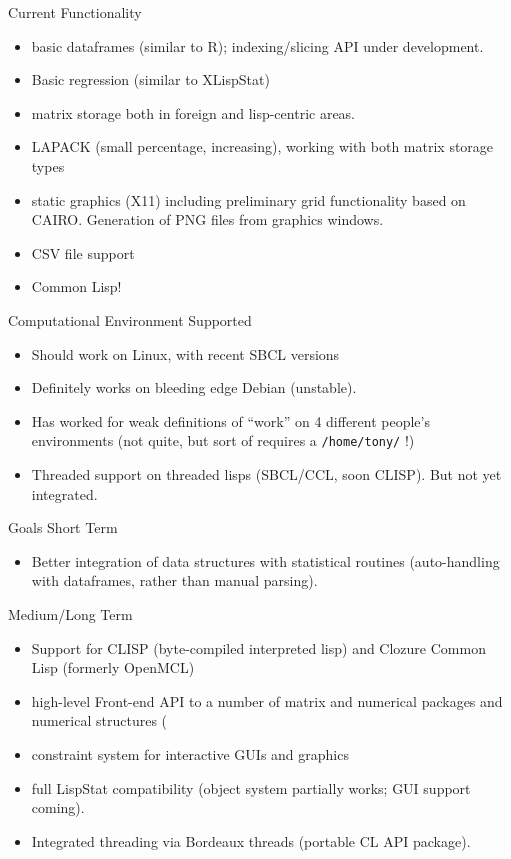 \documentclass{beamer}
\begin{document}
\begin{frame}{Current Functionality}
  \begin{itemize}
  \item basic dataframes (similar to R); indexing/slicing API under
    development. 
  \item Basic regression (similar to XLispStat)
  \item matrix storage both in foreign and lisp-centric areas.
  \item LAPACK (small percentage, increasing), working with both
    matrix storage types
  \item static graphics (X11) including preliminary grid functionality based
    on CAIRO.  Generation of PNG files from graphics windows.
  \item CSV file support
  \item Common Lisp!
  \end{itemize}
\end{frame}

\begin{frame}[fragile]{Computational Environment Supported}
  \begin{itemize}
  \item Should  work on Linux, with recent SBCL versions
  \item Definitely works on bleeding edge Debian (unstable).
  \item Has worked for weak definitions of ``work'' on 4 different
    people's environments (not quite, but sort of requires a
    \verb+/home/tony/+ !)
  \item Threaded support on threaded lisps (SBCL/CCL, soon CLISP).
    But not yet integrated.
  \end{itemize}
\end{frame}

\begin{frame}{Goals}
  Short Term
  \begin{itemize}
  \item Better integration of data structures with statistical routines
    (auto-handling with dataframes, rather than manual parsing). 
  \end{itemize}
  Medium/Long Term 
  \begin{itemize}
  \item Support for CLISP (byte-compiled interpreted lisp) and Clozure
    Common Lisp (formerly OpenMCL)
  \item high-level Front-end API to a number of matrix and numerical
    packages and numerical structures (
  \item constraint system for interactive GUIs and graphics
  \item full LispStat compatibility (object system partially works;
    GUI support coming).
  \item Integrated threading via Bordeaux threads (portable CL API package).
  \end{itemize}
\end{frame}
\end{document}
